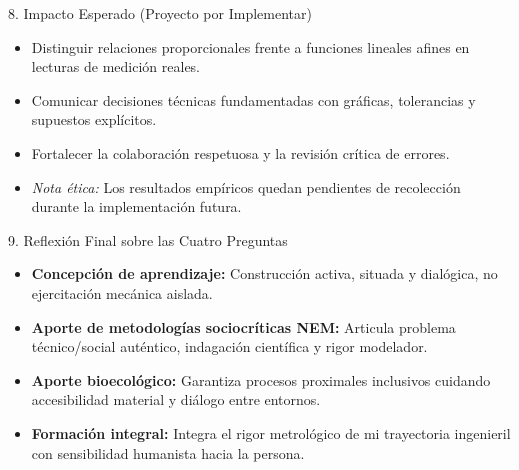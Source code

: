 \documentclass[aspectratio=169,spanish,xcolor=table]{beamer}
\begin{document}
\begin{frame}{8. Impacto Esperado (Proyecto por Implementar)}
  \begin{itemize}\normalsize
    \item Distinguir relaciones proporcionales frente a funciones lineales afines en lecturas de medición reales.
    \item Comunicar decisiones técnicas fundamentadas con gráficas, tolerancias y supuestos explícitos.
    \item Fortalecer la colaboración respetuosa y la revisión crítica de errores.
    \item \textit{Nota ética:} Los resultados empíricos quedan pendientes de recolección durante la implementación futura.
  \end{itemize}
\end{frame}

\begin{frame}{9. Reflexión Final sobre las Cuatro Preguntas}
  \begin{itemize}\scriptsize
    \item \textbf{Concepción de aprendizaje:} Construcción activa, situada y dialógica, no ejercitación mecánica aislada.
    \item \textbf{Aporte de metodologías sociocríticas NEM:} Articula problema técnico/social auténtico, indagación científica y rigor modelador.
    \item \textbf{Aporte bioecológico:} Garantiza procesos proximales inclusivos cuidando accesibilidad material y diálogo entre entornos.
    \item \textbf{Formación integral:} Integra el rigor metrológico de mi trayectoria ingenieril con sensibilidad humanista hacia la persona.
  \end{itemize}
\end{frame}
\end{document}
